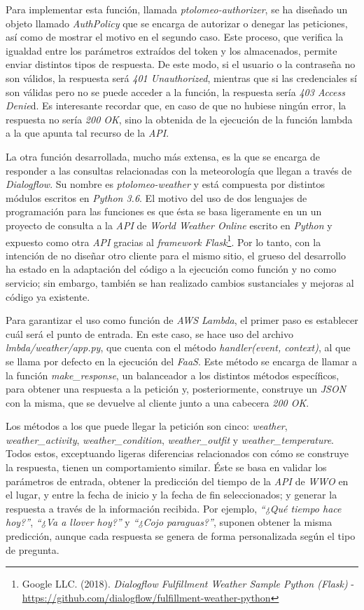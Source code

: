 \documentclass[11pt,spanish,listoffigures]{tfgetsinf}
\begin{document}
Para implementar esta función, llamada \textit{ptolomeo-authorizer}, se ha diseñado un objeto llamado \textit{AuthPolicy} que se encarga de autorizar o denegar las peticiones, así como de mostrar el motivo en el segundo caso. Este proceso, que verifica la igualdad entre los parámetros extraídos del token y los almacenados, permite enviar distintos tipos de respuesta. De este modo, si el usuario o la contraseña no son válidos, la respuesta será \textit{401 Unauthorized}, mientras que si las credenciales sí son válidas pero no se puede acceder a la función, la respuesta sería \textit{403 Access Denie}d. Es interesante recordar que, en caso de que no hubiese ningún error, la respuesta no sería \textit{200 OK}, sino la obtenida de la ejecución de la función lambda a la que apunta tal recurso de la \textit{API}.

La otra función desarrollada, mucho más extensa, es la que se encarga de responder a las consultas relacionadas con la meteorología que llegan a través de \textit{Dialogflow}. Su nombre es \textit{ptolomeo-weather} y está compuesta por distintos módulos escritos en \textit{Python 3.6}. El motivo del uso de dos lenguajes de programación para las funciones es que ésta se basa ligeramente en un un proyecto de consulta a la \textit{API} de \textit{World Weather Online} escrito en \textit{Python} y expuesto como otra \textit{API} gracias al \textit{framework} \textit{Flask}\footnote{Google LLC. (2018). \textit{Dialogflow Fulfillment Weather Sample Python (Flask)
} - \url{https://github.com/dialogflow/fulfillment-weather-python}}. Por lo tanto, con la intención de no diseñar otro cliente para el mismo sitio, el grueso del desarrollo ha estado en la adaptación del código a la ejecución como función y no como servicio; sin embargo, también se han realizado cambios sustanciales y mejoras al código ya existente.

Para garantizar el uso como función de \textit{AWS Lambda}, el primer paso es establecer cuál será el punto de entrada. En este caso, se hace uso del archivo \textit{lmbda/weather/app.py}, que cuenta con el método \textit{handler(event, context)}, al que se llama por defecto en la ejecución del \textit{FaaS}. Este método se encarga de llamar a la función \textit{make\_response}, un balanceador a los distintos métodos específicos, para obtener una respuesta a la petición y, posteriormente, construye un \textit{JSON} con la misma, que se devuelve al cliente junto a una cabecera \textit{200 OK}. 

Los métodos a los que puede llegar la petición son cinco: \textit{weather}, \textit{weather\_activity}, \textit{weather\_condition}, \textit{weather\_outfit} y \textit{weather\_temperature}. Todos estos, exceptuando ligeras diferencias relacionados con cómo se construye la respuesta, tienen un comportamiento similar. Éste se basa en validar los parámetros de entrada, obtener la predicción del tiempo de la \textit{API} de \textit{WWO} en el lugar, y entre la fecha de inicio y la fecha de fin seleccionados; y generar la respuesta a través de la información recibida. Por ejemplo, \textit{“¿Qué tiempo hace hoy?”}, \textit{“¿Va a llover hoy?”}  y \textit{“¿Cojo paraguas?”}, suponen obtener la misma predicción, aunque cada respuesta se genera de forma personalizada según el tipo de pregunta.
\end{document}
